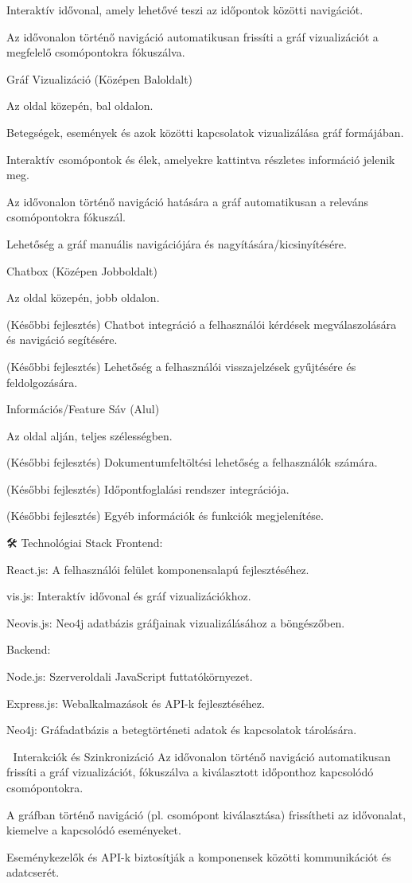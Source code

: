 Interaktív idővonal, amely lehetővé teszi az időpontok közötti navigációt.​

Az idővonalon történő navigáció automatikusan frissíti a gráf vizualizációt a megfelelő csomópontokra fókuszálva.​

Gráf Vizualizáció (Középen Baloldalt)

Az oldal közepén, bal oldalon.​

Betegségek, események és azok közötti kapcsolatok vizualizálása gráf formájában.​

Interaktív csomópontok és élek, amelyekre kattintva részletes információ jelenik meg.​

Az idővonalon történő navigáció hatására a gráf automatikusan a releváns csomópontokra fókuszál.​

Lehetőség a gráf manuális navigációjára és nagyítására/kicsinyítésére.​

Chatbox (Középen Jobboldalt)

Az oldal közepén, jobb oldalon.​

(Későbbi fejlesztés) Chatbot integráció a felhasználói kérdések megválaszolására és navigáció segítésére.​

(Későbbi fejlesztés) Lehetőség a felhasználói visszajelzések gyűjtésére és feldolgozására.​

Információs/Feature Sáv (Alul)

Az oldal alján, teljes szélességben.​

(Későbbi fejlesztés) Dokumentumfeltöltési lehetőség a felhasználók számára.​

(Későbbi fejlesztés) Időpontfoglalási rendszer integrációja.​

(Későbbi fejlesztés) Egyéb információk és funkciók megjelenítése.​

🛠️ Technológiai Stack
Frontend:

React.js: A felhasználói felület komponensalapú fejlesztéséhez.​

vis.js: Interaktív idővonal és gráf vizualizációkhoz.​

Neovis.js: Neo4j adatbázis gráfjainak vizualizálásához a böngészőben.​

Backend:

Node.js: Szerveroldali JavaScript futtatókörnyezet.​

Express.js: Webalkalmazások és API-k fejlesztéséhez.​

Neo4j: Gráfadatbázis a betegtörténeti adatok és kapcsolatok tárolására.​

🔄 Interakciók és Szinkronizáció
Az idővonalon történő navigáció automatikusan frissíti a gráf vizualizációt, fókuszálva a kiválasztott időponthoz kapcsolódó csomópontokra.​

A gráfban történő navigáció (pl. csomópont kiválasztása) frissítheti az idővonalat, kiemelve a kapcsolódó eseményeket.​

Eseménykezelők és API-k biztosítják a komponensek közötti kommunikációt és adatcserét.​


